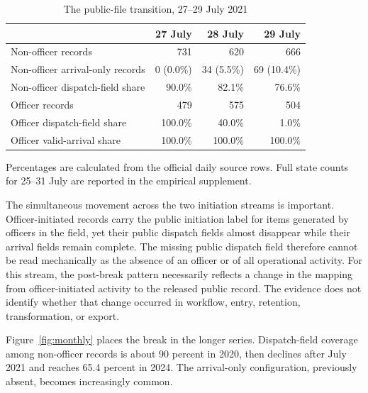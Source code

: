 \documentclass[11pt]{article}
\begin{document}
\begin{table}[!htbp]
\centering
\caption{The public-file transition, 27--29 July 2021}
\label{tab:julybreak}
\begin{tabular}{@{}lrrr@{}}
\toprule
 & 27 July & 28 July & 29 July \\
\midrule
Non-officer records & 731 & 620 & 666 \\
Non-officer arrival-only records & 0 (0.0\%) & 34 (5.5\%) & 69 (10.4\%) \\
Non-officer dispatch-field share & 90.0\% & 82.1\% & 76.6\% \\
Officer records & 479 & 575 & 504 \\
Officer dispatch-field share & 100.0\% & 40.0\% & 1.0\% \\
Officer valid-arrival share & 100.0\% & 100.0\% & 100.0\% \\
\bottomrule
\end{tabular}
\begin{minipage}{0.96\textwidth}\footnotesize
Percentages are calculated from the official daily source rows. Full state counts for 25--31 July are reported in the empirical supplement.
\end{minipage}
\end{table}

The simultaneous movement across the two initiation streams is important. Officer-initiated records carry the public initiation label for items generated by officers in the field, yet their public dispatch fields almost disappear while their arrival fields remain complete. The missing public dispatch field therefore cannot be read mechanically as the absence of an officer or of all operational activity. For this stream, the post-break pattern necessarily reflects a change in the mapping from officer-initiated activity to the released public record. The evidence does not identify whether that change occurred in workflow, entry, retention, transformation, or export.

Figure~\ref{fig:monthly} places the break in the longer series. Dispatch-field coverage among non-officer records is about 90 percent in 2020, then declines after July 2021 and reaches 65.4 percent in 2024. The arrival-only configuration, previously absent, becomes increasingly common.
\end{document}
